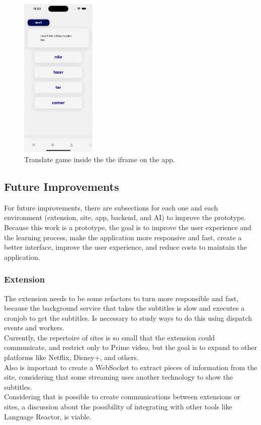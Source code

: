 \documentclass[12pt]{article}
\begin{document}
  \begin{figure}[!h]
    \centering
    \caption{
     Translate game inside the the iframe on the app.
    }
    \label{fig:app6}
    \includegraphics[width=0.32\textwidth]{assets/19.png}
  \end{figure}


\subsection{Future Improvements}

For future improvements, there are subsections for each one and each environment (extension, site, app, backend, and AI) to improve the prototype. Because this work is a prototype, the goal is to improve the user experience and the learning process,  make the application more responsive and fast, create a better interface, improve the user experience, and reduce costs to maintain the application.

\subsubsection{Extension}
The extension needs to be some refactors to turn more responsible and fast, because the background service that takes the subtitles is slow and executes a cronjob to get the subtitles. Is necessary to study ways to do this using dispatch events and workers. \\
Currently, the repertoire of sites is so small that the extension could communicate, and restrict only to Prime video, but the goal is to expand to other platforms like Netflix, Disney+, and others. \\
Also is important to create a WebSocket to extract pieces of information from the site, considering that some streaming uses another technology to show the subtitles. \\
Considering that is possible to create communications between extensions or sites, a discussion about the possibility of integrating with other tools like Language Reactor, is viable.
\end{document}
